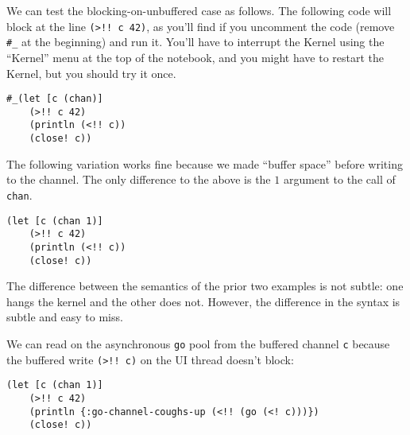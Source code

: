 \documentclass[10pt,oneside,x11names]{article}
\begin{document}
We can test the blocking-on-unbuffered case as follows. The following
code will block at the line \texttt{(>!! c 42)}, as you'll find if you
uncomment the code (remove \texttt{\#\_} at the beginning) and run it. You'll
have to interrupt the Kernel using the ``Kernel'' menu at the top of the
notebook, and you might have to restart the Kernel, but you should try
it once.

\begin{verbatim}
#_(let [c (chan)]
    (>!! c 42)
    (println (<!! c))
    (close! c))
\end{verbatim}

The following variation works fine because we made ``buffer space'' before
writing to the channel. The only difference to the above is the \(1\)
argument to the call of \texttt{chan}.

\begin{verbatim}
(let [c (chan 1)]
    (>!! c 42)
    (println (<!! c))
    (close! c))
\end{verbatim}

The difference between the semantics of the prior two examples is not
subtle: one hangs the kernel and the other does not. However, the
difference in the syntax is subtle and easy to miss.

We can read on the asynchronous \texttt{go} pool from the buffered channel \texttt{c}
because the buffered write \texttt{(>!! c)} on the UI thread doesn't block:

\begin{verbatim}
(let [c (chan 1)]
    (>!! c 42)
    (println {:go-channel-coughs-up (<!! (go (<! c)))})
    (close! c))
\end{verbatim}
\end{document}
